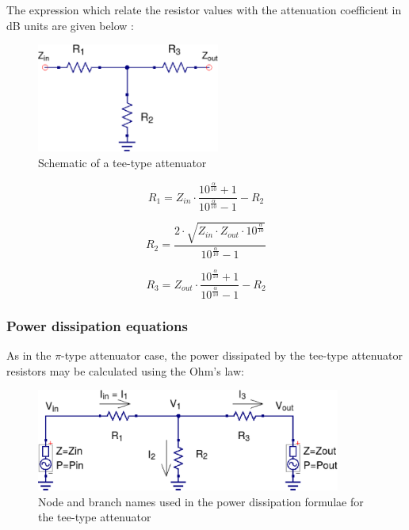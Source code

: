 \noindent The expression which relate the resistor values with the attenuation coefficient in dB units are given below \cite{Vizmuller}:

\begin{figure}[ht]
\begin{center}
\includegraphics[width=6cm]{Tee-Attenuator-Schematic.eps}
\end{center}
\caption{Schematic of a tee-type attenuator}
\label{fig:tee_attenuator_schematic}
\end{figure}

\begin{equation}
R_{1} = Z_{in} \cdot  \frac{10^{\frac{\alpha}{10}}+1}{10^{\frac{\alpha}{10}}-1} - R_{2}
\end{equation}

\begin{equation}
R_{2} = \dfrac{2 \cdot \sqrt{Z_{in} \cdot Z_{out} \cdot 10^{\frac{\alpha}{10}}}}{10^{\frac{\alpha}{10}} - 1}
\end{equation}

\begin{equation}
R_{3} = Z_{out} \cdot  \frac{10^{\frac{\alpha}{10}}+1}{10^{\frac{\alpha}{10}}-1} - R_{2}
\end{equation}

\subsubsection{Power dissipation equations}

\noindent As in the $\pi$-type attenuator case, the power dissipated by the tee-type attenuator resistors may be calculated using the Ohm's law:

\begin{figure}[ht]
\begin{center}
\includegraphics[width=10cm]{Tee-Type-Power-Dissipation}
\end{center}
\caption{Node and branch names used in the power dissipation formulae for the tee-type attenuator}
\label{fig:tee_attenuator_power_dissipation}
\end{figure}
\FloatBarrier

